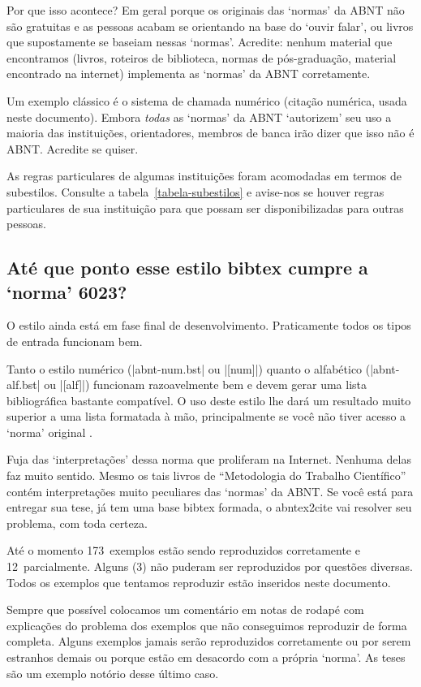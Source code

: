 \documentclass[a4paper]{ltxdoc}
\newcommand{\OKs}{173}
\newcommand{\quaseOKs}{12}
\newcommand{\nadaOK}{3}
\begin{document}
Por que isso acontece? Em geral porque os originais das `normas' da ABNT não
são gratuitas e as pessoas acabam se orientando na base do
`ouvir falar', ou livros que supostamente se baseiam nessas `normas'.
Acredite: nenhum material que encontramos (livros, roteiros de biblioteca,
normas de pós-graduação, material encontrado na internet) implementa
as `normas' da ABNT corretamente.

Um exemplo clássico é o sistema de chamada numérico (citação numérica, usada
neste documento). Embora \emph{todas} as `normas' da
ABNT\cite{NBR6023:2000,NBR10520:1988,NBR10520:2001} `autorizem' seu uso a
maioria das instituições, orientadores, membros de banca irão dizer que isso
não é ABNT. Acredite se quiser.

As regras particulares de algumas instituições foram acomodadas em termos de
subestilos. Consulte a tabela~\ref{tabela-subestilos} e avise-nos se houver
regras particulares de sua instituição para que possam ser disponibilizadas
para outras pessoas.

\subsection{Até que ponto esse estilo \textsf{bibtex} cumpre a `norma' 6023?}

O estilo ainda está em fase final de desenvolvimento. Praticamente
todos os tipos de entrada funcionam bem.

Tanto o estilo numérico (|abnt-num.bst| ou |[num]|) quanto o alfabético
(|abnt-alf.bst| ou |[alf]|) funcionam razoavelmente bem e devem
gerar uma lista bibliográfica bastante compatível. O uso deste estilo lhe dará
um resultado muito superior a uma lista formatada à mão, principalmente se você
não tiver acesso a `norma' original \cite{NBR6023:2000}.

Fuja das `interpretações' dessa norma que proliferam na Internet. Nenhuma delas
faz muito sentido. Mesmo os tais livros de ``Metodologia do Trabalho
Científico'' contém interpretações muito peculiares das `normas' da ABNT.
Se você está para entregar sua tese, já tem uma base \textsf{bibtex} formada,
o \textsf{abntex2cite} vai resolver seu problema, com toda certeza.

Até o momento \OKs\ exemplos estão sendo reproduzidos corretamente e \quaseOKs\
parcialmente. Alguns (\nadaOK) não puderam ser reproduzidos por questões
diversas. Todos os exemplos que tentamos reproduzir estão inseridos neste
documento.

Sempre que possível colocamos um comentário em notas de rodapé com explicações
do problema dos exemplos que não conseguimos reproduzir de forma completa.
Alguns exemplos jamais serão reproduzidos corretamente ou por serem estranhos
demais ou porque estão em desacordo com a própria `norma'. As teses são um
exemplo notório desse último caso.
\end{document}
